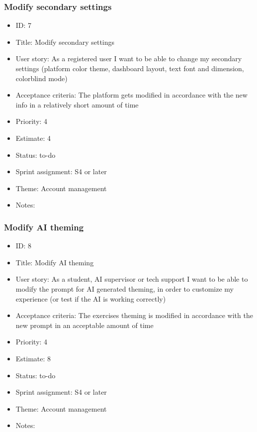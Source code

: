 \subsubsection{Modify secondary settings}
\begin{itemize}
	\item ID: 7
	\item Title: Modify secondary settings
	\item User story: As a registered user I want to be able to change my secondary settings (platform color theme, dashboard layout, text font and dimension, colorblind mode)
	\item Acceptance criteria: The platform gets modified in accordance with the new info in a relatively short amount of time
	\item Priority: 4
	\item Estimate: 4
	\item Status: to-do
	\item Sprint assignment: S4 or later
	\item Theme: Account management
	\item Notes:
\end{itemize}

\subsubsection{Modify AI theming}
\begin{itemize}
	\item ID: 8
	\item Title: Modify AI theming
	\item User story: As a student, AI supervisor or tech support I want to be able to modify the prompt for AI generated theming, in order to customize my experience (or test if the AI is working correctly)
	\item Acceptance criteria: The exercises theming is modified in accordance with the new prompt in an acceptable amount of time
	\item Priority: 4
	\item Estimate: 8
	\item Status: to-do
	\item Sprint assignment: S4 or later
	\item Theme: Account management
	\item Notes:
\end{itemize}

